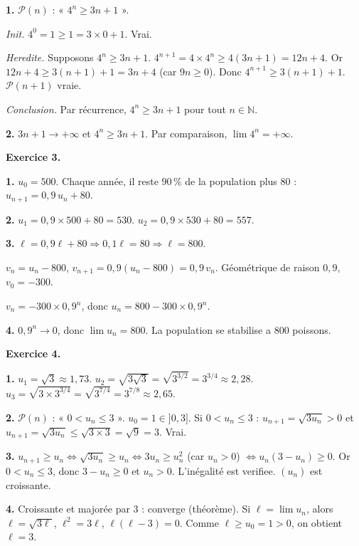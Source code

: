 \textbf{1.} $\mathcal{P}(n)$ : « $4^n \geq 3n + 1$ ».

\textit{Init.} $4^0 = 1 \geq 1 = 3 \times 0 + 1$. Vrai.

\textit{Heredite.} Supposons $4^n \geq 3n+1$. $4^{n+1} = 4 \times 4^n \geq 4(3n+1) = 12n + 4$. Or $12n + 4 \geq 3(n+1) + 1 = 3n + 4$ (car $9n \geq 0$). Donc $4^{n+1} \geq 3(n+1)+1$. $\mathcal{P}(n+1)$ vraie.

\textit{Conclusion.} Par récurrence, $4^n \geq 3n+1$ pour tout $n \in \mathbb{N}$.

\textbf{2.} $3n + 1 \to +\infty$ et $4^n \geq 3n + 1$. Par comparaison, $\boxed{\lim 4^n = +\infty}$.

\bigskip


\textbf{Exercice 3.}

\textbf{1.} $u_0 = 500$. Chaque année, il reste $90\,\%$ de la population plus $80$ : $u_{n+1} = 0{,}9\,u_n + 80$.

\textbf{2.} $u_1 = 0{,}9 \times 500 + 80 = 530$. $u_2 = 0{,}9 \times 530 + 80 = 557$.

\textbf{3.} $\ell = 0{,}9\ell + 80 \Rightarrow 0{,}1\ell = 80 \Rightarrow \ell = 800$.

$v_n = u_n - 800$, $v_{n+1} = 0{,}9(u_n - 800) = 0{,}9\,v_n$. Géométrique de raison $0{,}9$, $v_0 = -300$.

$v_n = -300 \times 0{,}9^n$, donc $u_n = 800 - 300 \times 0{,}9^n$.

\textbf{4.} $0{,}9^n \to 0$, donc $\lim u_n = \boxed{800}$. La population se stabilise a $800$ poissons.

\bigskip


\textbf{Exercice 4.}

\textbf{1.} $u_1 = \sqrt{3} \approx 1{,}73$. $u_2 = \sqrt{3\sqrt{3}} = \sqrt{3^{3/2}} = 3^{3/4} \approx 2{,}28$. $u_3 = \sqrt{3 \times 3^{3/4}} = \sqrt{3^{7/4}} = 3^{7/8} \approx 2{,}65$.

\textbf{2.} $\mathcal{P}(n)$ : « $0 < u_n \leq 3$ ». $u_0 = 1 \in ]0, 3]$. Si $0 < u_n \leq 3$ : $u_{n+1} = \sqrt{3u_n} > 0$ et $u_{n+1} = \sqrt{3u_n} \leq \sqrt{3 \times 3} = \sqrt{9} = 3$. Vrai.

\textbf{3.} $u_{n+1} \geq u_n \iff \sqrt{3u_n} \geq u_n \iff 3u_n \geq u_n^2$ (car $u_n > 0$) $\iff u_n(3 - u_n) \geq 0$. Or $0 < u_n \leq 3$, donc $3 - u_n \geq 0$ et $u_n > 0$. L'inégalité est verifiee. $(u_n)$ est croissante.

\textbf{4.} Croissante et majorée par $3$ : converge (théorème). Si $\ell = \lim u_n$, alors $\ell = \sqrt{3\ell}$, $\ell^2 = 3\ell$, $\ell(\ell - 3) = 0$. Comme $\ell \geq u_0 = 1 > 0$, on obtient $\boxed{\ell = 3}$.
